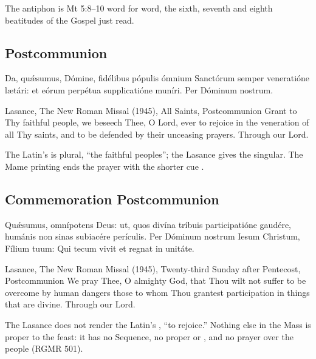 \noindent The antiphon is Mt 5:8--10 word for word, the sixth, seventh and
eighth beatitudes of the Gospel just read.

\subsection{Postcommunion}
\label{proper-postcommunion}


\begin{latinproper}
Da, quǽsumus, Dómine, fidélibus pópulis ómnium Sanctórum semper
veneratióne lætári: et eórum perpétua supplicatióne muníri. Per Dóminum
nostrum.
\end{latinproper}

\begin{englishwitness}{Lasance, The New Roman Missal (1945), All Saints, Postcommunion}
Grant to Thy faithful people, we beseech Thee, O Lord, ever to rejoice in the
veneration of all Thy saints, and to be defended by their unceasing prayers.
Through our Lord.
\end{englishwitness}

\noindent The Latin's  is plural, ``the faithful
peoples''; the Lasance gives the singular. The Mame printing ends the prayer
with the shorter cue .

\subsection{Commemoration Postcommunion}
\label{proper-commemoration-postcommunion}


\begin{latinproper}
Quǽsumus, omnípotens Deus: ut, quos divína tríbuis participatióne
gaudére, humánis non sinas subiacére perículis. Per Dóminum nostrum Iesum
Christum, Fílium tuum: Qui tecum vivit et regnat in unitáte.
\end{latinproper}

\begin{englishwitness}{Lasance, The New Roman Missal (1945), Twenty-third Sunday after Pentecost, Postcommunion}
We pray Thee, O almighty God, that Thou wilt not suffer to be overcome by
human dangers those to whom Thou grantest participation in things that are
divine. Through our Lord.
\end{englishwitness}

\noindent The Lasance does not render the Latin's ,
``to rejoice.'' Nothing else in the Mass is proper to the feast: it has no
Sequence, no proper  or , and no
prayer over the people (RGMR 501).
